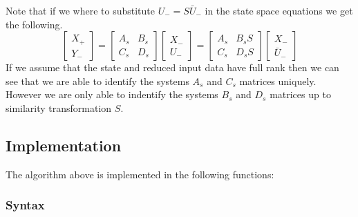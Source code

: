 Note that if we where to substitute $U_- = S\bar{U}_-$ in the state space equations we get the following.
\[ \begin{bmatrix} X_{+} \\ Y_{-} \end{bmatrix} = 
\begin{bmatrix} A_s & B_s \\ C_s & D_s \end{bmatrix} 
\begin{bmatrix} X_{-} \\ U_{-} \end{bmatrix} = 
\begin{bmatrix} A_s & B_sS \\ C_s & D_sS \end{bmatrix} 
\begin{bmatrix} X_{-} \\ \bar{U}_{-} \end{bmatrix}
 \]
If we assume that the state and reduced input data have full rank then we can see that we are able to identify the systems $A_s$ and $C_s$ matrices uniquely. However we are only able to indentify the systems $B_s$ and $D_s$ matrices up to similarity transformation $S$.

\subsection{Implementation}
The algorithm above is implemented in the following functions:
\subsubsection*{Syntax} 
 \\

